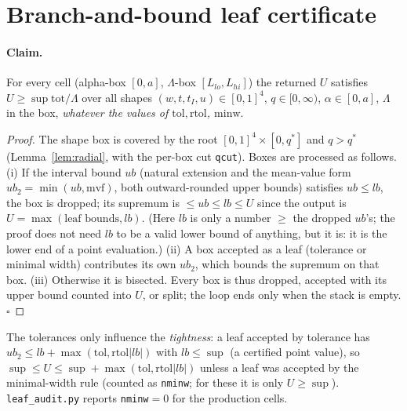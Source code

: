\documentclass[11pt]{article}
\theoremstyle{definition}
\newcommand{\Ly}{\Lambda}
\newcommand{\tot}{\mathrm{tot}}
\begin{document}
\section{Branch-and-bound leaf certificate}
\paragraph{Claim.} For every cell (alpha-box $[0,a]$, $\Ly$-box $[L_{lo},L_{hi}]$) the returned $U$ satisfies $U\ge\sup\tot/\Ly$ over all shapes $(w,t,t_I,u)\in[0,1]^4$, $q\in[0,\infty)$, $\alpha\in[0,a]$, $\Ly$ in the box, \emph{whatever the values of $\mathrm{tol},\mathrm{rtol}$, $\mathrm{minw}$}.
\begin{proof} The shape box is covered by the root $[0,1]^4\times[0,q^*]$ and $q>q^*$ (Lemma~\ref{lem:radial}, with the per-box cut \texttt{qcut}). Boxes are processed as follows. (i) If the interval bound $ub$ (natural extension and the mean-value form $ub_2=\min(ub,\text{mvf})$, both outward-rounded upper bounds) satisfies $ub\le lb$, the box is dropped; its supremum is $\le ub\le lb\le U$ since the output is $U=\max(\text{leaf bounds},lb)$. (Here $lb$ is only a number $\ge$ the dropped $ub$'s; the proof does not need $lb$ to be a valid lower bound of anything, but it is: it is the lower end of a point evaluation.) (ii) A box accepted as a leaf (tolerance or minimal width) contributes its own $ub_2$, which bounds the supremum on that box. (iii) Otherwise it is bisected. Every box is thus dropped, accepted with its upper bound counted into $U$, or split; the loop ends only when the stack is empty. $\square$
\end{proof}
The tolerances only influence the \emph{tightness}: a leaf accepted by tolerance has $ub_2\le lb+\max(\mathrm{tol},\mathrm{rtol}|lb|)$ with $lb\le\sup$ (a certified point value), so $\sup\le U\le\sup+\max(\mathrm{tol},\mathrm{rtol}|lb|)$ unless a leaf was accepted by the minimal-width rule (counted as \texttt{nminw}; for these it is only $U\ge\sup$). \texttt{leaf\_audit.py} reports \texttt{nminw}$=0$ for the production cells.
\end{document}

